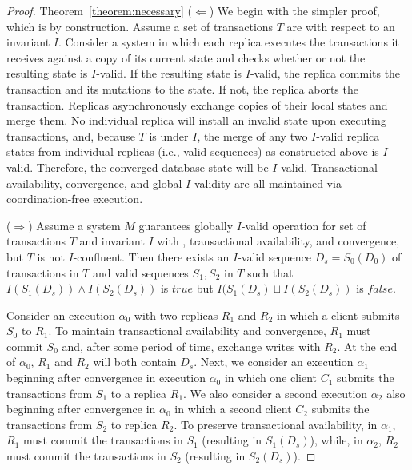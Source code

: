 \begin{proof}{Theorem~\ref{theorem:necessary}}
($\Leftarrow$) We begin with the simpler proof, which is by
  construction. Assume a set of transactions $T$ are \iconfluent with
  respect to an invariant $I$. Consider a system in which each replica
  executes the transactions it receives against a copy of its current
  state and checks whether or not the resulting state is $I$-valid. If
  the resulting state is $I$-valid, the replica commits the
  transaction and its mutations to the state. If not, the replica
  aborts the transaction. Replicas asynchronously exchange copies of
  their local states and merge them. No individual replica will
  install an invalid state upon executing transactions, and, because
  $T$ is \iconfluent under $I$, the merge of any two $I$-valid replica
  states from individual replicas (i.e., valid sequences) as
  constructed above is $I$-valid. Therefore, the converged database
  state will be $I$-valid. Transactional availability, convergence,
  and global $I$-validity are all maintained via coordination-free
  execution.

($\Rightarrow$) Assume a system $M$ guarantees globally $I$-valid
  operation for set of transactions $T$ and invariant $I$ with
  \cfreedom, transactional availability, and convergence, but $T$ is
  not $I$-confluent. Then there exists an $I$-valid sequence
  $D_s=S_0(D_0)$ of transactions in $T$ and valid sequences $S_1,S_2$
  in $T$ such that $I(S_1(D_s)) \wedge I(S_2(D_s))$ is $true$
  but $I(S_1(D_s) \sqcup I(S_2(D_s))$ is $false$.

  Consider an execution $\alpha_0$ with two replicas $R_1$ and $R_2$
  in which a client submits $S_0$ to $R_1$. To maintain transactional
  availability and convergence, $R_1$ must commit $S_0$ and, after
  some period of time, exchange writes with $R_2$. At the end of
  $\alpha_0$, $R_1$ and $R_2$ will both contain $D_s$. Next, we
  consider an execution $\alpha_1$ beginning after convergence in
  execution $\alpha_0$ in which one client $C_1$ submits the
  transactions from $S_1$ to a replica $R_1$. We also consider a
  second execution $\alpha_2$ also beginning after convergence in
  $\alpha_0$ in which a second client $C_2$ submits the transactions
  from $S_2$ to replica $R_2$. To preserve transactional availability,
  in $\alpha_1$, $R_1$ must commit the transactions in $S_1$
  (resulting in $S_1(D_s)$), while, in $\alpha_2$, $R_2$ must commit
  the transactions in $S_2$ (resulting in $S_2(D_s)$).


\end{proof}
